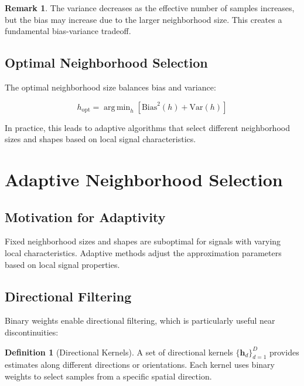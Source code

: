 \documentclass[12pt]{article}
\DeclareMathOperator{\argmin}{arg\,min}
\renewcommand{\vec}[1]{\mathbf{#1}}
\theoremstyle{definition}
\newtheorem{definition}[theorem]{Definition}
\newtheorem{remark}[theorem]{Remark}
\begin{document}
\begin{remark}
    The variance decreases as the effective number of samples increases, but the bias may increase due to the larger neighborhood size. This creates a fundamental bias-variance tradeoff.
\end{remark}

\subsection{Optimal Neighborhood Selection}
\label{subsec:optimal_neighborhood}

The optimal neighborhood size balances bias and variance:

\begin{equation}
    \label{eq:optimal_tradeoff}
    h_{\text{opt}} = \argmin_h \left[ \text{Bias}^2(h) + \text{Var}(h) \right]
\end{equation}

In practice, this leads to adaptive algorithms that select different neighborhood sizes and shapes based on local signal characteristics.

\newpage

\section{Adaptive Neighborhood Selection}
\label{sec:adaptive}

\subsection{Motivation for Adaptivity}
\label{subsec:adaptive_motivation}

Fixed neighborhood sizes and shapes are suboptimal for signals with varying local characteristics. Adaptive methods adjust the approximation parameters based on local signal properties.

\subsection{Directional Filtering}
\label{subsec:directional}

Binary weights enable directional filtering, which is particularly useful near discontinuities:

\begin{definition}[Directional Kernels]
    \label{def:directional_kernels}
    A set of directional kernels $\{\vec{h}_d\}_{d=1}^{D}$ provides estimates along different directions or orientations. Each kernel uses binary weights to select samples from a specific spatial direction.
\end{definition}
\end{document}
